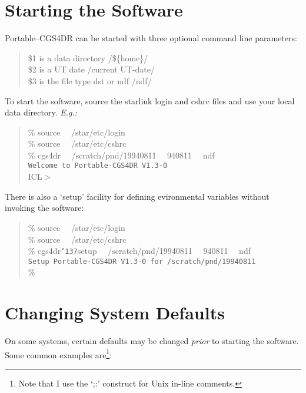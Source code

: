 \documentclass[a4paper]{book}
\renewcommand{\_}{{\tt\char'137}}
\begin{document}
\section{Starting the Software}
Portable--CGS4DR can be started with three optional command line parameters:

\begin{minipage}{120mm}
\begin{quote}
  \$1 is a data directory \hfill /\$\{home\}/ \\
  \$2 is a UT date \hfill /current UT-date/ \\
  \$3 is the file type {\sc dst} or {\sc ndf} \hfill /ndf/
\end{quote}
\end{minipage}

To start the software, source the {\sc starlink} login and cshrc files
and use your local data directory. {\em E.g.:}

\begin{minipage}{120mm}
\begin{quote}
  \%  source \ \ /star/etc/login \\
  \%  source \ \ /star/etc/cshrc \\
  \%  cgs4dr \ \ /scratch/pnd/19940811 \ \ 940811 \ \ ndf \\[4ex]
      {\tt Welcome to Portable-CGS4DR V1.3-0} \\[2ex]
  ICL$>$
\end{quote}
\end{minipage}

There is also a `setup' facility for defining evironmental variables without
invoking the software:

\begin{minipage}{120mm}
\begin{quote}
  \%  source \ \ /star/etc/login \\
  \%  source \ \ /star/etc/cshrc \\
  \%  cgs4dr\_setup \ \ /scratch/pnd/19940811 \ \ 940811 \ \ ndf \\[4ex]
      {\tt Setup Portable-CGS4DR V1.3-0 for /scratch/pnd/19940811} \\[2ex]
  \%
\end{quote}
\end{minipage}

\section{Changing System Defaults}
On some systems, certain defaults may be changed {\em prior} to
starting the software. Some common examples are\footnote[2]{Note that I
use the `;:' construct for Unix in-line comments.}:
\end{document}

